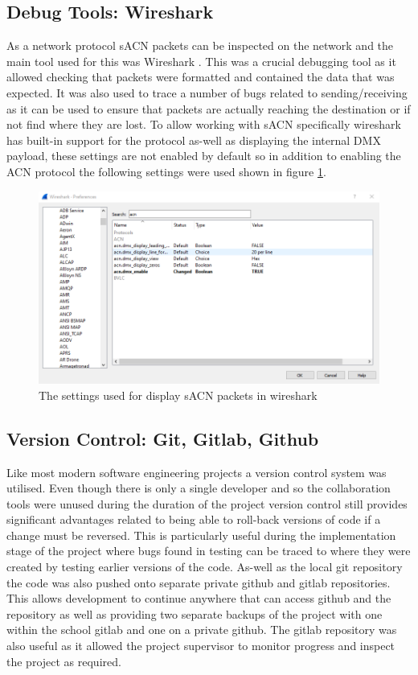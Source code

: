 \documentclass[11pt,a4paper]{article}
\begin{document}
\subsection{Debug Tools: Wireshark}
As a network protocol sACN packets can be inspected on the network and the main tool used for this was Wireshark \cite{WIRESHARK}. This was a crucial debugging tool as it allowed checking that packets were formatted and contained the data that was expected. It was also used to trace a number of bugs related to sending/receiving as it can be used to ensure that packets are actually reaching the destination or if not find where they are lost.  To allow working with sACN specifically wireshark has built-in support for the protocol as-well as displaying the internal DMX payload, these settings are not enabled by default so in addition to enabling the ACN protocol the following settings were used shown in figure \ref{WIRESHARK_SETTINGS}.

\begin{figure}[H]
	\label{WIRESHARK_SETTINGS}
	\includegraphics[width=\textwidth]{wireshark-settings}
	\caption{The settings used for display sACN packets in wireshark}
\end{figure}

\subsection{Version Control: Git, Gitlab, Github}
Like most modern software engineering projects a version control system was utilised. Even though there is only a single developer and so the collaboration tools were unused during the duration of the project version control still provides significant advantages related to being able to roll-back versions of code if a change must be reversed. This is particularly useful during the implementation stage of the project where bugs found in testing can be traced to where they were created by testing earlier versions of the code. As-well as the local git repository the code was also pushed onto separate private github and gitlab repositories. This allows development to continue anywhere that can access github and the repository as well as providing two separate backups of the project with one within the school gitlab and one on a private github. The gitlab repository was also useful as it allowed the project supervisor to monitor progress and inspect the project as required.
\end{document}
